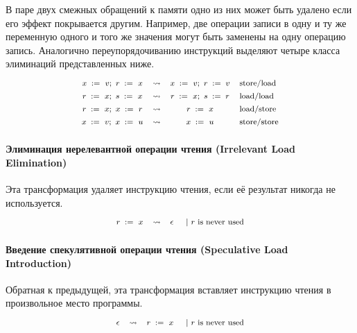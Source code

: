 В паре двух смежных обращений к памяти
одно из них может быть удалено 
если его эффект покрывается другим. 
Например, две операции записи в одну и ту же переменную 
одного и того же значения могут быть заменены 
на одну операцию запись. 
Аналогично переупорядочиванию инструкций 
выделяют четыре класса элиминаций
представленных ниже. 
%
\[\def\arraystretch{1.4}\footnotesize
  \begin{array}{cccl} 

      \writeInst{}{x}{v} \seq \readInst{}{r}{x} 
    & \leadsto 
    & \writeInst{}{x}{v} \seq \assignInst{r}{v}
    & \text{store/load}  \\ 

      \readInst{}{r}{x} \seq \readInst{}{s}{x} 
    & \leadsto 
    & \readInst{}{r}{x} \seq \assignInst{s}{r}
    & \text{load/load}  \\ 

      \readInst{}{r}{x} \seq \writeInst{}{x}{r} 
    & \leadsto 
    & \readInst{}{r}{x} 
    & \text{load/store}  \\ 

      \writeInst{}{x}{v} \seq \writeInst{}{x}{u} 
    & \leadsto 
    & \writeInst{}{x}{u}
    & \text{store/store}  \\ 

  \end{array}
\]

\paragraph{
Элиминация нерелевантной операции чтения
(Irrelevant Load Elimination)
}

Эта трансформация удаляет инструкцию чтения, 
если её результат никогда не используется. 
%
\[\def\arraystretch{1.4}\footnotesize
  \begin{array}{cccl} 

      \readInst{}{r}{x} 
    & \leadsto 
    & \epsInst
    & ~|~ \text{$r$ is never used}  \\ 

  \end{array}
\]

\paragraph{
Введение спекулятивной операции чтения
(Speculative Load Introduction)
}

Обратная к предыдущей, эта трансформация 
вставляет инструкцию чтения в произвольное место программы.
%
\[\def\arraystretch{1.4}\footnotesize
  \begin{array}{cccl} 

      \epsInst
    & \leadsto 
    & \readInst{}{r}{x} 
    & ~|~ \text{$r$ is never used}  \\ 

  \end{array}
\]

